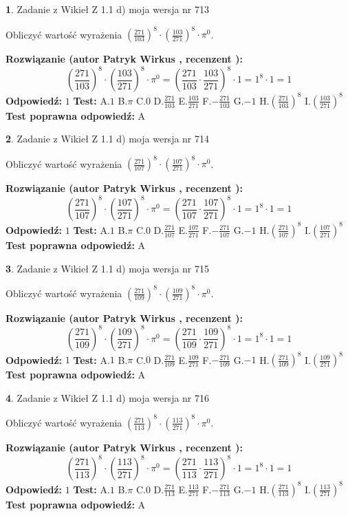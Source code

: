\documentclass[12pt, a4paper]{article}
\theoremstyle{definition} %
\newtheorem{zad}{}
\newcommand{\zadStart}[1]{\begin{zad}#1\newline}
\newcommand{\zadStop}{\end{zad}}
\newcommand{\rozwStart}[2]{\noindent \textbf{Rozwiązanie (autor #1 , recenzent #2): }\newline}
\newcommand{\rozwStop}{\newline}
\newcommand{\odpStart}{\noindent \textbf{Odpowiedź:}\newline}
\newcommand{\odpStop}{\newline}
\newcommand{\testStart}{\noindent \textbf{Test:}\newline}
\newcommand{\testStop}{\newline}
\newcommand{\kluczStart}{\noindent \textbf{Test poprawna odpowiedź:}\newline}
\newcommand{\kluczStop}{\newline}
\begin{document}
\zadStart{Zadanie z Wikieł Z 1.1 d) moja wersja nr 713}

Obliczyć wartość wyrażenia $(\frac{271}{103})^{8} \cdot (\frac{103}{271})^{8} \cdot \pi^{0}$.
\zadStop
\rozwStart{Patryk Wirkus}{}
$$(\frac{271}{103})^{8} \cdot (\frac{103}{271})^{8} \cdot \pi^{0} = (\frac{271}{103} \cdot \frac{103}{271})^{8} \cdot 1 = 1^{8} \cdot 1 = 1$$
\rozwStop
\odpStart
$1$
\odpStop
\testStart
A.$1$ B.$\pi$ C.$0$ D.$\frac{271}{103}$ E.$\frac{103}{271}$
F.$-\frac{271}{103}$ G.$-1$
H.$(\frac{271}{103})^{8}$
I.$(\frac{103}{271})^{8}$
\testStop
\kluczStart
A
\kluczStop



\zadStart{Zadanie z Wikieł Z 1.1 d) moja wersja nr 714}

Obliczyć wartość wyrażenia $(\frac{271}{107})^{8} \cdot (\frac{107}{271})^{8} \cdot \pi^{0}$.
\zadStop
\rozwStart{Patryk Wirkus}{}
$$(\frac{271}{107})^{8} \cdot (\frac{107}{271})^{8} \cdot \pi^{0} = (\frac{271}{107} \cdot \frac{107}{271})^{8} \cdot 1 = 1^{8} \cdot 1 = 1$$
\rozwStop
\odpStart
$1$
\odpStop
\testStart
A.$1$ B.$\pi$ C.$0$ D.$\frac{271}{107}$ E.$\frac{107}{271}$
F.$-\frac{271}{107}$ G.$-1$
H.$(\frac{271}{107})^{8}$
I.$(\frac{107}{271})^{8}$
\testStop
\kluczStart
A
\kluczStop



\zadStart{Zadanie z Wikieł Z 1.1 d) moja wersja nr 715}

Obliczyć wartość wyrażenia $(\frac{271}{109})^{8} \cdot (\frac{109}{271})^{8} \cdot \pi^{0}$.
\zadStop
\rozwStart{Patryk Wirkus}{}
$$(\frac{271}{109})^{8} \cdot (\frac{109}{271})^{8} \cdot \pi^{0} = (\frac{271}{109} \cdot \frac{109}{271})^{8} \cdot 1 = 1^{8} \cdot 1 = 1$$
\rozwStop
\odpStart
$1$
\odpStop
\testStart
A.$1$ B.$\pi$ C.$0$ D.$\frac{271}{109}$ E.$\frac{109}{271}$
F.$-\frac{271}{109}$ G.$-1$
H.$(\frac{271}{109})^{8}$
I.$(\frac{109}{271})^{8}$
\testStop
\kluczStart
A
\kluczStop



\zadStart{Zadanie z Wikieł Z 1.1 d) moja wersja nr 716}

Obliczyć wartość wyrażenia $(\frac{271}{113})^{8} \cdot (\frac{113}{271})^{8} \cdot \pi^{0}$.
\zadStop
\rozwStart{Patryk Wirkus}{}
$$(\frac{271}{113})^{8} \cdot (\frac{113}{271})^{8} \cdot \pi^{0} = (\frac{271}{113} \cdot \frac{113}{271})^{8} \cdot 1 = 1^{8} \cdot 1 = 1$$
\rozwStop
\odpStart
$1$
\odpStop
\testStart
A.$1$ B.$\pi$ C.$0$ D.$\frac{271}{113}$ E.$\frac{113}{271}$
F.$-\frac{271}{113}$ G.$-1$
H.$(\frac{271}{113})^{8}$
I.$(\frac{113}{271})^{8}$
\testStop
\kluczStart
A
\kluczStop
\end{document}
